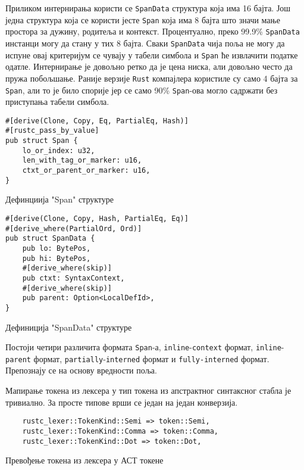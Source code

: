 Приликом интернирања користи се \verb|SpanData| структура која има 16 бајта. Још једна структура која 
се користи јесте \verb|Span| која има 8 бајта што значи мање простора за дужину, родитеља и контекст. 
Процентуално, преко 99.9\%  \verb|SpanData| инстанци могу да стану у тих 8 бајта. Сваки \verb|SpanData|
чија поља не могу да испуне овај критеријум се чувају у табели симбола и \verb|Span| ће извлачити податке 
одатле. Интернирање је довољно ретко да је цена ниска, али довољно често да пружа побољшање. 
Раније верзије \verb|Rust| компајлера користиле су само 4 бајта за \verb|Span|, али то је било спорије 
јер се само 90\% \verb|Span|-ова могло садржати без приступања табели симбола.

\begin{listing}[H]
\begin{verbatim}
#[derive(Clone, Copy, Eq, PartialEq, Hash)]
#[rustc_pass_by_value]
pub struct Span {
    lo_or_index: u32,
    len_with_tag_or_marker: u16,
    ctxt_or_parent_or_marker: u16,
}
\end{verbatim}
\caption{Дефинциија "Span" структуре}
\end{listing}


\begin{listing}[H]
\begin{verbatim}
#[derive(Clone, Copy, Hash, PartialEq, Eq)]
#[derive_where(PartialOrd, Ord)]
pub struct SpanData {
    pub lo: BytePos,
    pub hi: BytePos,
    #[derive_where(skip)]
    pub ctxt: SyntaxContext,
    #[derive_where(skip)]
    pub parent: Option<LocalDefId>,
}
\end{verbatim}
\caption{Дефиниција "SpanData" структуре}
\end{listing}

Постоји четири различита формата \verb|Span|-а, \verb|inline|-\verb|context| формат, \verb|inline|-\verb|parent| формат,
\verb|partially|-\verb|interned| формат и \verb|fully-interned| формат.  Препознају се на основу вредности поља.

Мапирање токена из лексера у тип токена из апстрактног синтаксног стабла је тривиално.
За просте типове врши се један на један конверзија.

\begin{listing}[H]
\begin{verbatim}
    rustc_lexer::TokenKind::Semi => token::Semi,
    rustc_lexer::TokenKind::Comma => token::Comma,
    rustc_lexer::TokenKind::Dot => token::Dot,
\end{verbatim}
\caption{Превођење токена из лексера у АСТ токене}
\end{listing}

